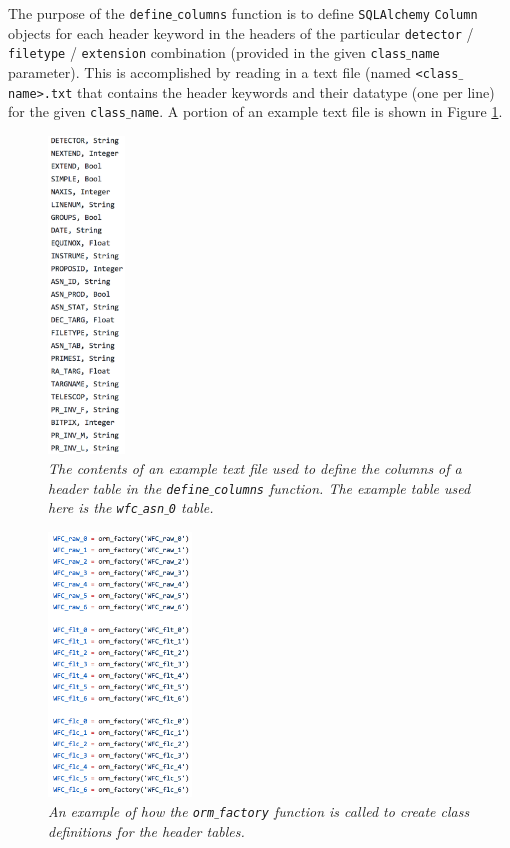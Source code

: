 \documentclass[10pt,journal,compsoc]{IEEEtran}
\begin{document}
The purpose of the \texttt{define$\_$columns} function is to define \texttt{SQLAlchemy} \texttt{Column} objects for each header keyword in the headers of the particular
\texttt{detector} / \texttt{filetype} / \texttt{extension} combination (provided in the given \texttt{class$\_$name} parameter).  This is accomplished by reading in a text file
(named \texttt{<class$\_$name>.txt} that contains the header keywords and their datatype (one per line) for the given \texttt{class$\_$name}. A portion of an example text file
is shown in Figure \ref{fig17}.

\begin{figure}[!h]
\centering
\includegraphics[width=0.8in]{./figures/table_definition.png}
\caption{\textit{The contents of an example text file used to define the columns of a header table in the \texttt{define$\_$columns} function. The example table used here is
the \texttt{wfc$\_$asn$\_$0} table.}}
\label{fig17}
\end{figure}

\begin{figure}[!h]
\centering
\includegraphics[width=1.5in]{./figures/orm_factory_calls.png}
\caption{\textit{An example of how the \texttt{orm$\_$factory} function is called to create class definitions for the header tables.}}
\label{fig18}
\end{figure}
\end{document}
